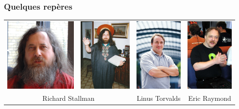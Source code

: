 \documentclass[10pt]{beamer}
\begin{document}
\begin{frame}
  \frametitle{Quelques repères}
  \begin{tabular}{cccc}
      \includegraphics[height=10em]{rms.jpg} 
      &
      \includegraphics[height=10em]{saintignucius.jpg}
      &
      \includegraphics[height=10em]{linus.jpg} 
      & 
      \includegraphics[height=10em]{esr.jpg} 
      \\
      \multicolumn{2}{c}{Richard Stallman}
      &
      Linus Torvalds
      &
      Eric Raymond\\
  \end{tabular}
\end{frame}

\end{document}

